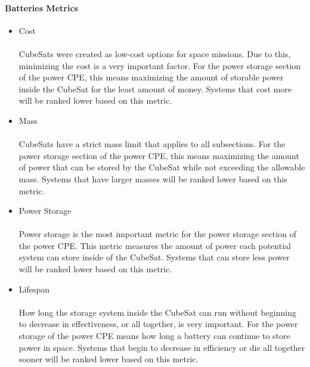 \paragraph{Batteries Metrics}
\begin{itemize}
\item Cost\\
\\
CubeSats were created as low-cost options for space missions.  Due to this, minimizing the cost is a very important factor.  For the power storage section of the power CPE, this means maximizing the amount of storable power inside the CubeSat for the least amount of money. Systems that cost more will be ranked lower based on this metric.
\\
\item{Mass} \\
\\
CubeSats have a strict mass limit that applies to all subsections. For the power storage section of the power CPE, this means maximizing the amount of power that can be stored by the CubeSat while not exceeding the allowable mass. Systems that have larger masses will be ranked lower based on this metric.
\\
\item{Power Storage} \\
\\
Power storage is the most important metric for the power storage section of the power CPE. This metric measures the amount of power each potential system can store inside of the CubeSat. Systems that can store less power will be ranked lower based on this metric.
\\
\item{Lifespan} \\
\\
How long the storage system inside the CubeSat can run without beginning to decrease in effectiveness, or all together, is very important. For the power storage of the power CPE means how long a battery can continue to store power in space.  Systems that begin to decrease in efficiency or die all together sooner will be ranked lower based on this metric.
\end{itemize}
